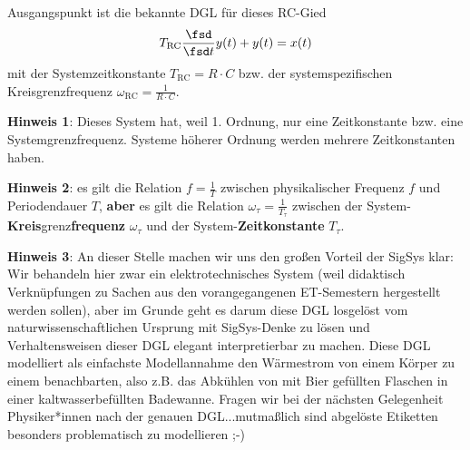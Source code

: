 \begin{Ansatz}
Ausgangspunkt ist die bekannte DGL für dieses RC-Gied
\begin{align}
T_\mathrm{RC}\frac{\fsd}{\fsd t} y(t) + y(t) = x(t)
\end{align}
mit der Systemzeitkonstante $T_\mathrm{RC}=R \cdot C$ bzw. der systemspezifischen
Kreisgrenzfrequenz $\omega_\mathrm{RC}=\frac{1}{R \cdot C}$.
%

\noindent\textbf{Hinweis 1}: Dieses System hat, weil 1. Ordnung, nur eine
Zeitkonstante bzw. eine Systemgrenzfrequenz.
Systeme höherer Ordnung werden mehrere Zeitkonstanten haben.

\noindent\textbf{Hinweis 2}: es gilt die
Relation $f=\frac{1}{T}$ zwischen physikalischer Frequenz $f$ und Periodendauer $T$, \textbf{aber}
es gilt die Relation $\omega_\tau = \frac{1}{T_\tau}$ zwischen der System-\textbf{Kreis}grenz\textbf{frequenz}
$\omega_\tau $ und der System-\textbf{Zeitkonstante} $T_\tau $.

\noindent \textbf{Hinweis 3}:
An dieser Stelle machen wir uns den großen Vorteil der SigSys klar:
%
Wir behandeln hier zwar ein elektrotechnisches System (weil didaktisch
Verknüpfungen zu Sachen aus den vorangegangenen ET-Semestern hergestellt werden
sollen), aber im Grunde geht es darum diese DGL losgelöst vom naturwissenschaftlichen
Ursprung mit SigSys-Denke zu lösen und Verhaltensweisen dieser DGL elegant
interpretierbar zu machen.
%
Diese DGL modelliert als einfachste Modellannahme den Wärmestrom von einem Körper
zu einem benachbarten, also z.B. das Abkühlen von mit Bier gefüllten Flaschen
in einer kaltwasserbefüllten Badewanne. Fragen wir bei der nächsten Gelegenheit
Physiker*innen nach der genauen DGL...mutmaßlich sind abgelöste Etiketten
besonders problematisch zu modellieren ;-)
\end{Ansatz}

